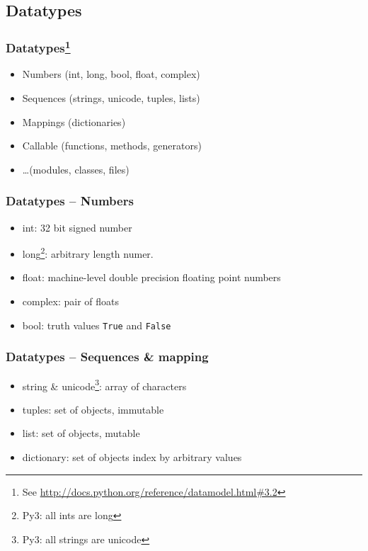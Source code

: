\documentclass[xetex,10pt]{beamer}
\newcommand{\pypypy}[1]{\footnote[frame]{Py3: #1}}
\def\pythoni{\lstinline[language=pythontim]}
\begin{document}
\subsection{Datatypes}

\begin{frame}[fragile]
	\frametitle{Datatypes\footnote[frame]{See \url{http://docs.python.org/reference/datamodel.html\#3.2}}}
	\begin{itemize}
		\item Numbers (int, long, bool, float, complex)
		\item Sequences (strings,  unicode, tuples, lists)
		\item Mappings (dictionaries)
		\item Callable (functions, methods, generators)
		\item \ldots (modules, classes, files)
	\end{itemize}
\end{frame}

\begin{frame}[fragile]
	\frametitle{Datatypes -- Numbers}

	\begin{itemize}
		\item int: 32 bit signed number
		\item long\pypypy{all ints are long}: arbitrary length numer.
		\item float: machine-level double precision floating point numbers
		\item complex: pair of floats
		\item bool: truth values \pythoni{True} and \pythoni{False}
	\end{itemize}
\end{frame}

\begin{frame}[fragile]
	\frametitle{Datatypes -- Sequences \& mapping}

	\begin{itemize}
		\item string \& unicode\pypypy{all strings are unicode}: array of characters
		\item tuples: set of objects, immutable
		\item list: set of objects, mutable
		\item dictionary: set of objects index by arbitrary values
	\end{itemize}
\end{frame}
\end{document}
